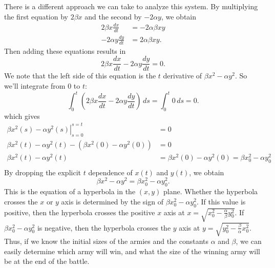 \documentclass[reqno]{immbook}
\numberwithin{equation}{chapter}
\numberwithin{question}{section}
\numberwithin{theorem}{chapter}
\numberwithin{figure}{chapter}
\theoremstyle{definition}
\begin{document}
There is a different approach we can take to analyze
this system.
By multiplying the first equation by $2\beta x$ and the
second by $-2\alpha y$, we obtain
\begin{equation}
\begin{split}
 2\beta x\frac{dx}{dt} & = -2 \alpha \beta x y \\
 -2\alpha y\frac{dy}{dt} & = 2 \alpha \beta x y.
\end{split}
\end{equation}
Then adding these equations results in
\begin{equation}
   2\beta x\frac{dx}{dt} -2\alpha y\frac{dy}{dt} = 0.
\end{equation}
We note that the left side of this equation is
the $t$ derivative of $\beta x^2 - \alpha y^2$.
So we'll integrate from $0$ to $t$:
\begin{equation}
   \int_0^t \left(2\beta x\frac{dx}{dt} -2\alpha y\frac{dy}{dt}\right)\, ds = \int_0^t 0 \, ds = 0.
\end{equation}
which gives
\begin{equation}
\begin{split}
  \left.\beta x^2(s) - \alpha y^2(s)\right|_{s=0}^{s=t} & = 0 \\
   \beta x^2(t) - \alpha y^2(t) - (\beta x^2(0) - \alpha y^2(0)) & = 0 \\
      \beta x^2(t) - \alpha y^2(t) & = \beta x^2(0) - \alpha y^2(0) =
         \beta x_0^2 - \alpha y_0^2 \\
\end{split}
\end{equation}
By dropping the explicit $t$ dependence of $x(t)$
and $y(t)$, we obtain
\begin{equation}
   \beta x^2 - \alpha y^2 = \beta x_0^2 - \alpha y_0^2.
   \label{eqn:lanchester_hyperbola}
\end{equation}
This is the equation of a hyperbola in the $(x,y)$ plane.
Whether the hyperbola crosses the $x$ or $y$ axis is
determined by the sign of
$\beta x_0^2 - \alpha y_0^2$.
If this value is positive, then the hyperbola
crosses the positive $x$ axis
at $x=\sqrt{x_0^2 - \frac{\alpha}{\beta} y_0^2}$.
If $\beta x_0^2 - \alpha y_0^2$
is negative, then the hyperbola
crosses the $y$ axis at
$y = \sqrt{y_0^2 - \frac{\beta}{\alpha} x_0^2}$.
Thus, if we know the initial sizes of the armies
and the constants $\alpha$ and $\beta$, we can
easily determine which army will win, and what the
size of the winning army will be at the end of the
battle.
\end{document}
